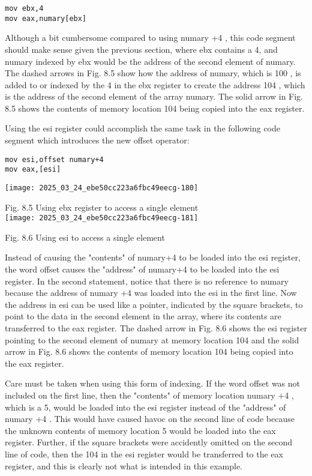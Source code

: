 \documentclass[10pt]{article}
\begin{document}
\begin{verbatim}
mov ebx,4
mov eax,numary[ebx]
\end{verbatim}

Although a bit cumbersome compared to using numary +4 , this code segment should make sense given the previous section, where ebx contains a 4, and numary indexed by ebx would be the address of the second element of numary. The dashed arrows in Fig. 8.5 show how the address of numary, which is 100 , is added to or indexed by the 4 in the ebx register to create the address 104 , which is the address of the second element of the array numary. The solid arrow in Fig. 8.5 shows the contents of memory location 104 being copied into the eax register.

Using the esi register could accomplish the same task in the following code segment which introduces the new offset operator:

\begin{verbatim}
mov esi,offset numary+4
mov eax,[esi]
\end{verbatim}

\begin{center}
\texttt{[image: 2025\_03\_24\_ebe50cc223a6fbc49eecg-180]}
\end{center}

Fig. 8.5 Using ebx register to access a single element\\
\texttt{[image: 2025\_03\_24\_ebe50cc223a6fbc49eecg-181]}

Fig. 8.6 Using esi to access a single element

Instead of causing the "contents" of numary+4 to be loaded into the esi register, the word offset causes the "address" of numary+4 to be loaded into the esi register. In the second statement, notice that there is no reference to numary because the address of numary +4 was loaded into the esi in the first line. Now the address in esi can be used like a pointer, indicated by the square brackets, to point to the data in the second element in the array, where its contents are transferred to the eax register. The dashed arrow in Fig. 8.6 shows the esi register pointing to the second element of numary at memory location 104 and the solid arrow in Fig. 8.6 shows the contents of memory location 104 being copied into the eax register.

Care must be taken when using this form of indexing. If the word offset was not included on the first line, then the "contents" of memory location numary +4 , which is a 5, would be loaded into the esi register instead of the "address" of numary +4 . This would have caused havoc on the second line of code because the unknown contents of memory location 5 would be loaded into the eax register. Further, if the square brackets were accidently omitted on the second line of code, then the 104 in the esi register would be transferred to the eax register, and this is clearly not what is intended in this example.
\end{document}
